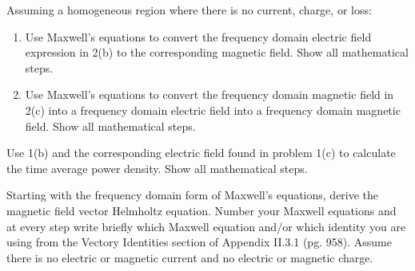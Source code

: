 \documentclass[11pt]{article}
\begin{document}
\pagebreak

\begin{homeworkProblem}

Assuming a homogeneous region where there is no current, charge, or loss:
\begin{enumerate}[label=(\alph*), topsep=5pt, itemsep=0pt]
    \item Use Maxwell's equations to convert the frequency domain electric field expression in 2(b) to the corresponding
    magnetic field. Show all mathematical steps.
    \item Use Maxwell's equations to convert the frequency domain magnetic field in 2(c) into a frequency domain electric
    field into a frequency domain magnetic field. Show all mathematical steps.
\end{enumerate} \vspace{1\baselineskip}

\solution

\end{homeworkProblem}

\pagebreak

\begin{homeworkProblem}

Use 1(b) and the corresponding electric field found in problem 1(c) to calculate the time average power density. 
Show all mathematical steps. \vspace{1\baselineskip}

\solution


\end{homeworkProblem}

\pagebreak

\begin{homeworkProblem}

Starting with the frequency domain form of Maxwell's equations, derive the magnetic field vector Helmholtz equation. Number
your Maxwell equations and at every step write briefly which Maxwell equation and/or which identity you are using
from the Vectory Identities section of Appendix II.3.1 (pg. 958). Assume there is no electric or magnetic current and
no electric or magnetic charge. \vspace{1\baselineskip}

\solution



\end{homeworkProblem}
\end{document}
